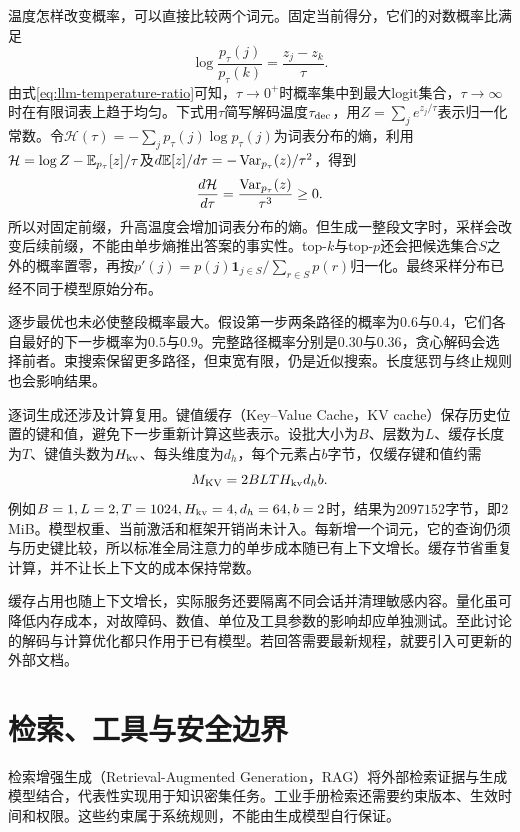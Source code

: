 温度怎样改变概率，可以直接比较两个词元。固定当前得分，它们的对数概率比满足
\begin{equation}
 \log\frac{p_\tau(j)}{p_\tau(k)}=\frac{z_j-z_k}{\tau}.\label{eq:llm-temperature-ratio}
\end{equation}
由式\eqref{eq:llm-temperature-ratio}可知，$\tau\to0^+$时概率集中到最大logit集合，$\tau\to\infty$时在有限词表上趋于均匀。下式用$\tau$简写解码温度$\tau_{\rm dec}$，用$Z=\sum_j e^{z_j/\tau}$表示归一化常数。令$\mathcal H(\tau)=-\sum_jp_\tau(j)\log p_\tau(j)$为词表分布的熵，利用$\mathcal H=\log Z-\mathbb{E}_{p_\tau}[z]/\tau$及$d\mathbb{E}[z]/d\tau=-\operatorname{Var}_{p_\tau}(z)/\tau^2$，得到
\begin{equation}
 \frac{d\mathcal H}{d\tau}=\frac{\operatorname{Var}_{p_\tau}(z)}{\tau^3}\geq0.
\end{equation}
所以对固定前缀，升高温度会增加词表分布的熵。但生成一整段文字时，采样会改变后续前缀，不能由单步熵推出答案的事实性。top-$k$与top-$p$还会把候选集合$S$之外的概率置零，再按$p'(j)=p(j)\mathbf1_{j\in S}/\sum_{r\in S}p(r)$归一化。最终采样分布已经不同于模型原始分布。

逐步最优也未必使整段概率最大。假设第一步两条路径的概率为$0.6$与$0.4$，它们各自最好的下一步概率为$0.5$与$0.9$。完整路径概率分别是$0.30$与$0.36$，贪心解码会选择前者。束搜索保留更多路径，但束宽有限，仍是近似搜索。长度惩罚与终止规则也会影响结果。

逐词生成还涉及计算复用。键值缓存（Key--Value Cache，KV cache）保存历史位置的键和值，避免下一步重新计算这些表示。设批大小为$B$、层数为$L$、缓存长度为$T$、键值头数为$H_{\rm kv}$、每头维度为$d_h$，每个元素占$b$字节，仅缓存键和值约需
\begin{equation}
 M_{\rm KV}=2BLTH_{\rm kv}d_hb.
\end{equation}
例如$B=1,L=2,T=1024,H_{\rm kv}=4,d_h=64,b=2$时，结果为$2097152$字节，即$2$ MiB。模型权重、当前激活和框架开销尚未计入。每新增一个词元，它的查询仍须与历史键比较，所以标准全局注意力的单步成本随已有上下文增长。缓存节省重复计算，并不让长上下文的成本保持常数。

缓存占用也随上下文增长，实际服务还要隔离不同会话并清理敏感内容。量化虽可降低内存成本，对故障码、数值、单位及工具参数的影响却应单独测试。至此讨论的解码与计算优化都只作用于已有模型。若回答需要最新规程，就要引入可更新的外部文档。

\section{检索、工具与安全边界}
检索增强生成（Retrieval-Augmented Generation，RAG）将外部检索证据与生成模型结合，代表性实现用于知识密集任务\cite{lewis2020rag}。工业手册检索还需要约束版本、生效时间和权限。这些约束属于系统规则，不能由生成模型自行保证。
